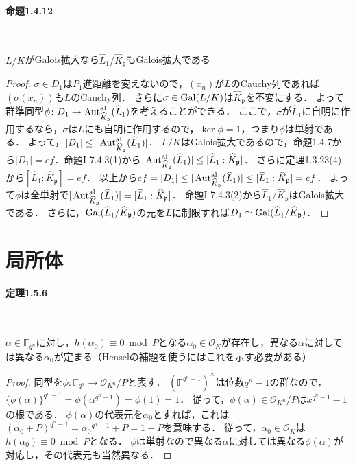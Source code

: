 \paragraph{命題1.4.12}~
\begin{screen}
  $L/K$がGalois拡大なら$\widehat{L}_1/\widehat{K}_\mathfrak{p}$もGalois拡大である
\end{screen}
\begin{proof}
  $\sigma\in D_1$は$P_1$進距離を変えないので，$(x_n)$が$L$のCauchy列であれば$(\sigma(x_n))$も$L$のCauchy列．
  さらに$\sigma\in\operatorname{Gal}(L/K)$は$\widehat{K}_\mathfrak{p}$を不変にする．
  よって群準同型$\phi\colon D_1\to\operatorname{Aut}_{\widehat{K}_\mathfrak{p}}^\text{al}(\widehat{L}_1)$を考えることができる．
  ここで，$\sigma$が$\widehat{L}_1$に自明に作用するなら，$\sigma$は$L$にも自明に作用するので，$\ker\phi = 1$，つまり$\phi$は単射である．
  よって，$|D_1|\leq|\operatorname{Aut}_{\widehat{K}_\mathfrak{p}}^\text{al}(\widehat{L}_1)|$．
  $L/K$はGalois拡大であるので，命題1.4.7から$|D_1| = ef$．命題I-7.4.3(1)から$|\operatorname{Aut}_{\widehat{K}_\mathfrak{p}}^\text{al}(\widehat{L}_1)|\leq[\widehat{L}_1:\widehat{K}_\mathfrak{p}]$．
  さらに定理1.3.23(4)から$[\widehat{L}_1:\widehat{K}_\mathfrak{p}] = ef$．
  以上から$ef = |D_1|\leq|\operatorname{Aut}_{\widehat{K}_\mathfrak{p}}^\text{al}(\widehat{L}_1)|\leq[\widehat{L}_1:\widehat{K}_\mathfrak{p}] = ef$．
  よって$\phi$は全単射で$|\operatorname{Aut}_{\widehat{K}_\mathfrak{p}}^\text{al}(\widehat{L}_1)| = [\widehat{L}_1:\widehat{K}_\mathfrak{p}]$．
  命題I-7.4.3(2)から$\widehat{L}_1/\widehat{K}_\mathfrak{p}$はGalois拡大である．
  さらに，$\operatorname{Gal}(\widehat{L}_1/\widehat{K}_\mathfrak{p})$の元を$L$に制限すれば$D_1\simeq\operatorname{Gal}(\widehat{L}_1/\widehat{K}_\mathfrak{p})$．
\end{proof}

\section{局所体}
\paragraph{定理1.5.6}~
\begin{screen}
  $\alpha\in\mathbb{F}_{q^n}$に対し，$h(\alpha_0)\equiv0\bmod P$となる$ \alpha_0\in\mathcal{O}_K$が存在し，異なる$\alpha$に対しては異なる$\alpha_0$が定まる（Henselの補題を使うにはこれを示す必要がある）
\end{screen}
\begin{proof}
  同型を$\phi\colon\mathbb{F}_{q^n}\to\mathcal{O}_{K^n}/P$と表す．
  $(\mathbb{F}^{q^n-1})^\times$は位数$q^n-1$の群なので，$\{\phi(\alpha)\}^{q^n-1} = \phi(\alpha^{q^n-1}) = \phi(1) = 1$．
  従って，$\phi(\alpha)\in\mathcal{O}_{K^n}/P$は$x^{q^n-1}-1$の根である．
  $\phi(\alpha)$の代表元を$\alpha_0$とすれば，これは$(\alpha_0 + P)^{q^n-1} = \alpha_0{}^{q^n-1} + P = 1 + P$を意味する．
  従って，$\alpha_0\in\mathcal{O}_K$は$h(\alpha_0)\equiv0\bmod P$となる．
  $\phi$は単射なので異なる$\alpha$に対しては異なる$\phi(\alpha)$が対応し，その代表元も当然異なる．
\end{proof}

